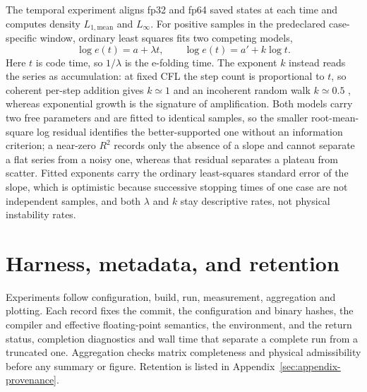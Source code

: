 The temporal experiment aligns fp32 and fp64 saved states at each time and
computes density $L_{1,\mathrm{mean}}$ and $L_\infty$. For positive samples in
the predeclared case-specific window, ordinary least squares fits two
competing models,
\begin{equation}
 \log e(t)=a+\lambda t,
 \qquad
 \log e(t)=a'+k\log t .
 \label{eq:ch3-temporal-fit}
\end{equation}
Here $t$ is code time, so $1/\lambda$ is the e-folding time. The exponent $k$
instead reads the series as accumulation: at fixed CFL the step count is
proportional to $t$, so coherent per-step addition gives $k\simeq1$ and an
incoherent random walk $k\simeq0.5$ \citep{crociEtAl2022stochastic}, whereas
exponential growth is the signature of amplification. Both models carry two free
parameters and are fitted to identical samples, so the smaller root-mean-square
log residual identifies the better-supported one without an information
criterion; a near-zero $R^2$ records only the absence of a slope and
cannot separate a flat series from a noisy one, whereas that residual separates
a plateau from scatter. Fitted exponents carry the ordinary least-squares
standard error of the slope, which is optimistic because successive stopping
times of one case are not independent samples, and both $\lambda$ and $k$ stay
descriptive rates, not physical instability rates.

\section{Harness, metadata, and retention}
\label{sec:ch3-harness-metadata}

Experiments follow configuration, build, run, measurement, aggregation and
plotting. Each record fixes the commit, the configuration and binary hashes, the
compiler and effective floating-point semantics, the environment, and the return
status, completion diagnostics and wall time that separate a complete run from a
truncated one. Aggregation checks matrix completeness and physical admissibility
before any summary or figure. Retention is listed in
Appendix~\ref{sec:appendix-provenance}.
